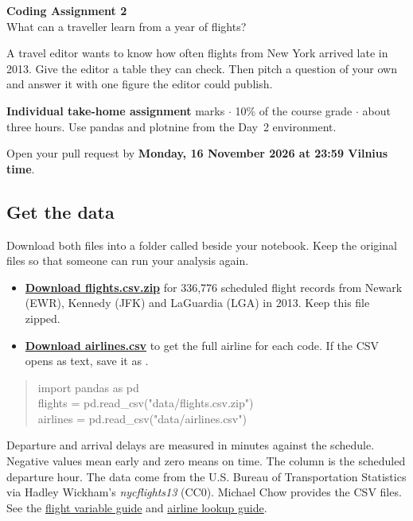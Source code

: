 \documentclass[11pt,a4paper]{article}
\newcommand{\py}[1]{\texttt{\detokenize{#1}}}
\newcommand{\dataurl}{https://raw.githubusercontent.com/machow/nycflights13-py/1d40369400d77379a78641afd119fc302a5a9659/nycflights13/data}
\begin{document}
\begin{center}
{\Large\textbf{Coding Assignment 2}}\\[3pt]
{\large What can a traveller learn from a year of flights?}
\end{center}

A travel editor wants to know how often flights from New York arrived late in 2013.
Give the editor a table they can check. Then pitch a question of your own and
answer it with one figure the editor could publish.

\textbf{Individual take-home assignment} marks $\cdot$ 10\% of the course grade
$\cdot$ about three hours. Use pandas and plotnine from the Day~2 environment.

Open your pull request by \textbf{Monday, 16 November 2026 at 23:59 Vilnius time}.

\subsection*{Get the data}
Download both files into a folder called \py{data} beside your notebook.
Keep the original files so that someone can run your analysis again.

\begin{itemize}
\item \href{\dataurl/flights.csv.zip}{\textbf{Download flights.csv.zip}} for
336,776 scheduled flight records from Newark (EWR), Kennedy (JFK)
and LaGuardia (LGA) in 2013. Keep this file zipped.
\item \href{\dataurl/airlines.csv}{\textbf{Download airlines.csv}} to get the
full airline \py{name} for each \py{carrier} code.
If the CSV opens as text, save it as \py{airlines.csv}.
\end{itemize}

\begin{quote}\ttfamily\small
import pandas as pd\\
flights = pd.read\_csv("data/flights.csv.zip")\\
airlines = pd.read\_csv("data/airlines.csv")
\end{quote}

Departure and arrival delays are measured in minutes against the schedule.
Negative values mean early and zero means on time. The \py{hour} column is the
scheduled departure hour. The data come from the U.S. Bureau of Transportation
Statistics via Hadley Wickham's \emph{nycflights13} (CC0). Michael Chow provides the CSV files.
See the \href{https://nycflights13.tidyverse.org/reference/flights.html}{flight variable guide}
and \href{https://nycflights13.tidyverse.org/reference/airlines.html}{airline lookup guide}.
\end{document}
